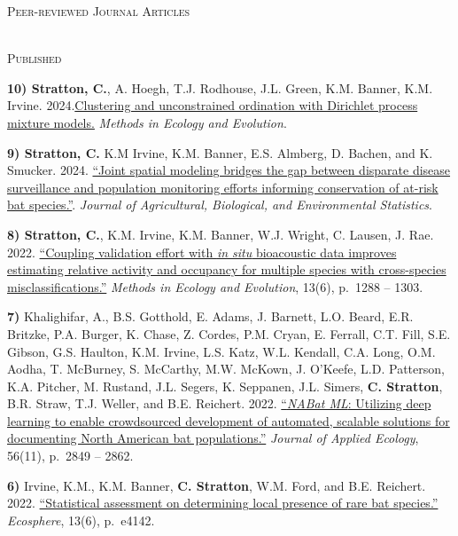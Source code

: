 \documentclass[a4paper]{article}
\newcommand{\lineunder} {
	\vspace*{-8pt} \\
	\hspace*{-18pt} \hrulefill \\
}
\newcommand{\header} [1] {
	{\hspace*{-18pt}\vspace*{6pt} \textcolor{Cerulean}{\textsc{#1}}}
	\vspace*{-6pt} \textcolor{Cerulean}{\lineunder}
}
\newcommand{\subheader} [1] {
	{\hspace*{-9pt}\vspace*{6pt} \textcolor{Cerulean}{\textsc{#1}}}
	\vspace*{-6pt}
}
\begin{document}
\header{Peer-reviewed Journal Articles}
\vspace*{2mm}

\subheader{Published}
\vspace*{2mm}

\textbf{10) Stratton, C.}, A. Hoegh, T.J. Rodhouse, J.L. Green, K.M.
Banner, K.M. Irvine.
2024.\href{https://doi.org/10.1111/2041-210X.14389}{Clustering and
unconstrained ordination with Dirichlet process mixture models.}
\textit{Methods in Ecology and Evolution}. \vspace*{2mm}

\textbf{9) Stratton, C.} K.M Irvine, K.M. Banner, E.S. Almberg, D.
Bachen, and K. Smucker. 2024.
\href{https://doi.org/10.1007/s13253-023-00593-8}{``Joint spatial
modeling bridges the gap between disparate disease surveillance and
population monitoring efforts informing conservation of at-risk bat
species.''}.
\textit{Journal of Agricultural, Biological, and Environmental Statistics}.
\vspace*{2mm}

\textbf{8) Stratton, C.}, K.M. Irvine, K.M. Banner, W.J. Wright, C.
Lausen, J. Rae. 2022.
\href{https://doi.org/10.1111/2041-210X.13831}{``Coupling validation
effort with \emph{in situ} bioacoustic data improves estimating relative
activity and occupancy for multiple species with cross-species
misclassifications.''} \textit{Methods in Ecology and Evolution}, 13(6),
p.~1288 -- 1303. \vspace*{2mm}

\textbf{7)} Khalighifar, A., B.S. Gotthold, E. Adams, J. Barnett, L.O.
Beard, E.R. Britzke, P.A. Burger, K. Chase, Z. Cordes, P.M. Cryan, E.
Ferrall, C.T. Fill, S.E. Gibson, G.S. Haulton, K.M. Irvine, L.S. Katz,
W.L. Kendall, C.A. Long, O.M. Aodha, T. McBurney, S. McCarthy, M.W.
McKown, J. O'Keefe, L.D. Patterson, K.A. Pitcher, M. Rustand, J.L.
Segers, K. Seppanen, J.L. Simers, \textbf{C. Stratton}, B.R. Straw, T.J.
Weller, and B.E. Reichert. 2022.
\href{https://doi.org/10.1111/1365-2664.14280}{``\emph{NABat ML}:
Utilizing deep learning to enable crowdsourced development of automated,
scalable solutions for documenting North American bat populations.''}
\textit{Journal of Applied Ecology}, 56(11), p.~2849 -- 2862.
\vspace*{2mm}

\textbf{6)} Irvine, K.M., K.M. Banner, \textbf{C. Stratton}, W.M. Ford,
and B.E. Reichert. 2022.
\href{https://doi.org/10.1002/ecs2.4142}{``Statistical assessment on
determining local presence of rare bat species.''} \textit{Ecosphere},
13(6), p.~e4142. \vspace*{2mm}
\end{document}

